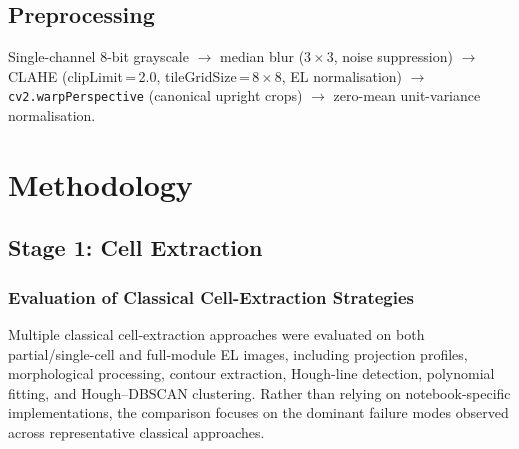 \documentclass[conference]{IEEEtran}
\begin{document}
\subsection{Preprocessing}
Single-channel 8-bit grayscale $\to$ median blur ($3\times3$, noise suppression) $\to$ CLAHE (clipLimit\,=\,2.0, tileGridSize\,=\,$8\times8$, EL normalisation) $\to$ \texttt{cv2.warpPerspective} (canonical upright crops) $\to$ zero-mean unit-variance normalisation.

\section{Methodology}
\label{sec:method}

\subsection{Stage 1: Cell Extraction}
\label{sec:stage1}

\subsubsection{Evaluation of Classical Cell-Extraction Strategies}

Multiple classical cell-extraction approaches were evaluated on both partial/single-cell and full-module EL images, including projection profiles, morphological processing, contour extraction, Hough-line detection, polynomial fitting, and Hough–DBSCAN clustering. Rather than relying on notebook-specific implementations, the comparison focuses on the dominant failure modes observed across representative classical approaches.
\end{document}
